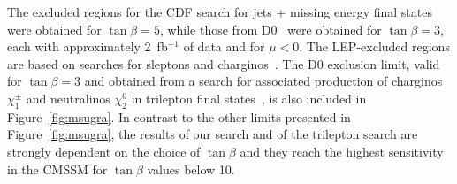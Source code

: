 The excluded regions  for the CDF
search for  jets + missing  energy final states~\cite{PhysRevLett.102.121801} were
obtained for $\tan\beta=5$, while those from D0~\cite{Abazov2008449} were obtained for 
$\tan\beta=3$, each with  approximately  2~fb$^{-1}$ of  data and for $\mu < 0$. 
The  LEP-excluded
regions  are based  on searches  for  sleptons and  charginos~\cite{LEPSUSY}.  
The D0 exclusion limit, valid for $\tan\beta=3$  and obtained from
a  search  for  associated  production   of  charginos $\chi_{1}^{\pm}$ and
neutralinos $\chi_2^0$ in  trilepton final states~\cite{Abazov200934}, is also
included  in Figure~\ref{fig:msugra}. In  contrast to  the other  limits  presented in
Figure~\ref{fig:msugra},  the results of our search and of the  trilepton search are  strongly dependent on
the choice  of $\tan\beta$ and  they reach the  highest sensitivity  in the
CMSSM for $\tan\beta$ values below 10.





